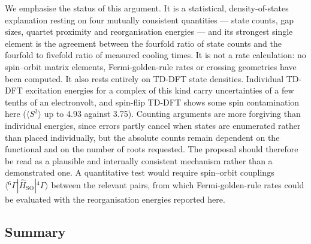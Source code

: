 \documentclass[11pt,a4paper]{article}
\begin{document}
We emphasise the status of this argument. It is a statistical, density-of-states
explanation resting on four mutually consistent quantities --- state counts, gap
sizes, quartet proximity and reorganisation energies --- and its strongest single
element is the agreement between the fourfold ratio of state counts and the
fourfold to fivefold ratio of measured cooling times. It is not a rate
calculation: no spin--orbit matrix elements, Fermi-golden-rule rates or crossing
geometries have been computed. It also rests entirely on TD-DFT state
densities. Individual TD-DFT excitation energies for a complex of this kind
carry uncertainties of a few tenths of an electronvolt, and spin-flip TD-DFT
shows some spin contamination here ($\langle S^{2}\rangle$ up to 4.93 against
3.75). Counting arguments are more forgiving than individual energies, since
errors partly cancel when states are enumerated rather than placed
individually, but the absolute counts remain dependent on the functional and
on the number of roots requested. The proposal should therefore be read as a
plausible and internally consistent mechanism rather than a demonstrated one.
A quantitative test would require spin--orbit couplings
$\langle {}^{6}\Gamma | \hat{H}_{\mathrm{SO}} | {}^{4}\Gamma \rangle$
between the relevant pairs, from which Fermi-golden-rule rates could be
evaluated with the reorganisation energies reported here.

\subsection{Summary}
\end{document}
